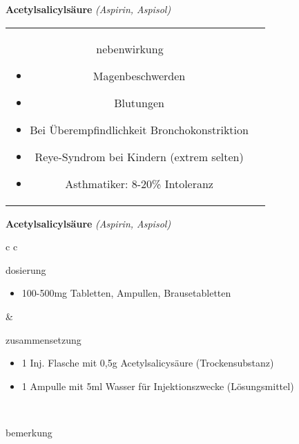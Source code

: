 \documentclass[12pt]{beamer}
\begin{document}
\begin{frame}{
    \textbf{Acetylsalicylsäure}
    \textit{(Aspirin, Aspisol)}
}
\begin{tabular}{c c}
\begin{beamercolorbox}[wd=\boxwidth\textwidth,ht=\boxheight\textheight,sep=1em]{nebenwirkung}
            \begin{itemize}
                \item Magenbeschwerden
                \item Blutungen
                \item Bei Überempfindlichkeit Bronchokonstriktion
                \item Reye-Syndrom bei Kindern (extrem selten)
                \item Asthmatiker: 8-20\% Intoleranz
            \end{itemize}
        \end{beamercolorbox} \\
    \end{tabular}
\end{frame}

\begin{frame}{
    \textbf{Acetylsalicylsäure}
    \textit{(Aspirin, Aspisol)}
}
    \begin{tabular}{c c}
        \begin{beamercolorbox}[wd=\boxwidth\textwidth,ht=\boxheight\textheight,sep=1em]{dosierung}
            \begin{itemize}
                \item 100-500mg Tabletten, Ampullen, Brausetabletten
            \end{itemize}
        \end{beamercolorbox} & 
        \begin{beamercolorbox}[wd=\boxwidth\textwidth,ht=\boxheight\textheight,sep=1em]{zusammensetzung}
            \begin{itemize}
                \item 1 Inj. Flasche mit 0,5g Acetylsalicysäure (Trockensubstanz)
                \item 1 Ampulle mit 5ml Wasser für Injektionszwecke (Lösungsmittel)
            \end{itemize}
        \end{beamercolorbox} \\
        \begin{beamercolorbox}[wd=\textwidth,ht=\boxheight\textheight,sep=1em]{bemerkung}
        \end{beamercolorbox} \\
    \end{tabular}
\end{frame}
\end{document}
